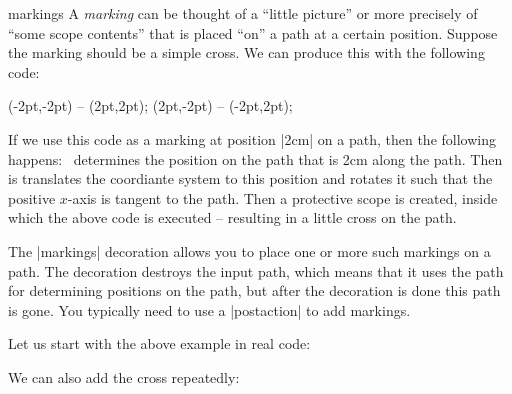 \begin{decoration}{markings}
  A \emph{marking} can be thought of a ``little picture'' or more
  precisely of ``some scope contents'' that is placed ``on'' a path at
  a certain position. Suppose the marking should be a simple cross. We
  can produce this with the following code:
\begin{codeexample}
\draw (-2pt,-2pt) -- (2pt,2pt);
\draw (2pt,-2pt) -- (-2pt,2pt);
\end{codeexample}
  If we use this code as a marking at position |2cm| on a path, then
  the following happens: \pgfname\ determines the position on the path
  that is 2cm along the path. Then is translates the coordiante system
  to this position and rotates it such that the positive $x$-axis is
  tangent to the path. Then a protective scope is created, inside
  which the above code is executed -- resulting in a little cross on
  the path.

  The |markings| decoration allows you to place one or more such
  markings on a path. The decoration destroys the input path, which
  means that it uses the path for determining positions on the path,
  but after the decoration is done this path is gone. You typically
  need to use a |postaction| to add markings.

  Let us start with the above example in real code:
\begin{codeexample}[]
\end{codeexample}  

  We can also add the cross repeatedly:
\begin{codeexample}[]
\end{codeexample}  


\end{decoration}
